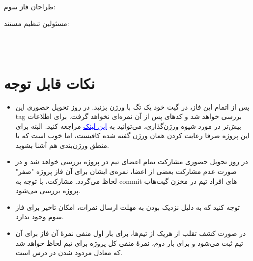 \documentclass[]{article}
\newcommand{\link}[2]{\href{#1}{\textcolor{blue}{#2}}}
\begin{document}
\begin{titlepage}
\begin{center}
        \vspace{0.10cm}
طراحان فاز سوم:\\
    \textbf{}
    
        \vspace{0.05cm}
مسئولین تنظیم مستند:\\
    \textbf{}
    

\end{center}
\end{titlepage}


\newpage
\pagestyle{fancy}
\fancyhf{}
\fancyfoot{}
\cfoot{\thepage}
\renewcommand{\headrulewidth}{2pt}

\KashidaOff



\tableofcontents

\newpage

 \Large \textbf{\\\\
}


\section*{{\titr نکات قابل توجه}}
\begin{itemize}
\item
پس از اتمام این فاز، در گیت خود یک تگ با ورژن  بزنید. در روز تحویل حضوری این tag بررسی خواهد شد و کدهای پس از آن نمره‌ای نخواهد گرفت. برای اطلاعات بیش‌تر در مورد شیوه ورژن‌گذاری، می‌توانید به
 \link{https://semver.org/}{\textcolor{blue}{\underline{این لینک}}}
 مراجعه کنید. البته برای این پروژه صرفا رعایت کردن همان ورژن گفته شده کافیست، اما خوب‌ است که با منطق ورژن‌بندی هم آشنا بشوید.

\item
در روز تحویل حضوری مشارکت تمام اعضای تیم در پروژه بررسی خواهد‌ شد و در صورت عدم مشارکت بعضی از اعضا، نمره‌ی ایشان برای آن فاز پروژه "صفر" لحاظ می‌گردد. مشارکت، با توجه به commit های افراد تیم در مخزن گیت‌هاب پروژه بررسی می‌شود.

\item
توجه کنید که به دلیل نزدیک بودن به مهلت ارسال نمرات، امکان تاخیر برای فاز سوم وجود ندارد.

\item
در صورت کشف تقلب از هریک از تیم‌ها، برای بار اول منفی نمرهٔ آن فاز برای آن تیم ثبت می‌شود و برای بار دوم، نمرهٔ منفی کل پروژه برای تیم لحاظ خواهد‌ شد که معادل مردود شدن در درس است.

\end{itemize}
\end{document}
